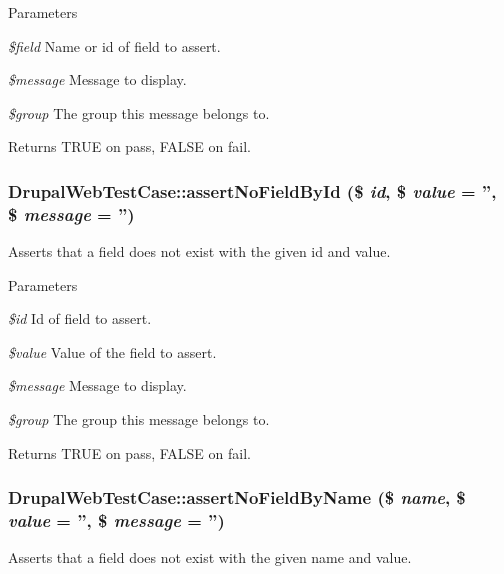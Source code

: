 \begin{DoxyParams}{Parameters}
\item[{\em \$field}]Name or id of field to assert. \item[{\em \$message}]Message to display. \item[{\em \$group}]The group this message belongs to. \end{DoxyParams}
\begin{DoxyReturn}{Returns}
TRUE on pass, FALSE on fail. 
\end{DoxyReturn}
\hypertarget{classDrupalWebTestCase_adbaec19474181965ddd70c6ee273d113}{
\subsubsection[{assertNoFieldById}]{\setlength{\rightskip}{0pt plus 5cm}DrupalWebTestCase::assertNoFieldById (\$ {\em id}, \/  \$ {\em value} = {\ttfamily ''}, \/  \$ {\em message} = {\ttfamily ''})}}
\label{classDrupalWebTestCase_adbaec19474181965ddd70c6ee273d113}
Asserts that a field does not exist with the given id and value.


\begin{DoxyParams}{Parameters}
\item[{\em \$id}]Id of field to assert. \item[{\em \$value}]Value of the field to assert. \item[{\em \$message}]Message to display. \item[{\em \$group}]The group this message belongs to. \end{DoxyParams}
\begin{DoxyReturn}{Returns}
TRUE on pass, FALSE on fail. 
\end{DoxyReturn}
\hypertarget{classDrupalWebTestCase_a323f24e8b6dcf37ae100ad7102ee85db}{
\subsubsection[{assertNoFieldByName}]{\setlength{\rightskip}{0pt plus 5cm}DrupalWebTestCase::assertNoFieldByName (\$ {\em name}, \/  \$ {\em value} = {\ttfamily ''}, \/  \$ {\em message} = {\ttfamily ''})}}
\label{classDrupalWebTestCase_a323f24e8b6dcf37ae100ad7102ee85db}
Asserts that a field does not exist with the given name and value.


